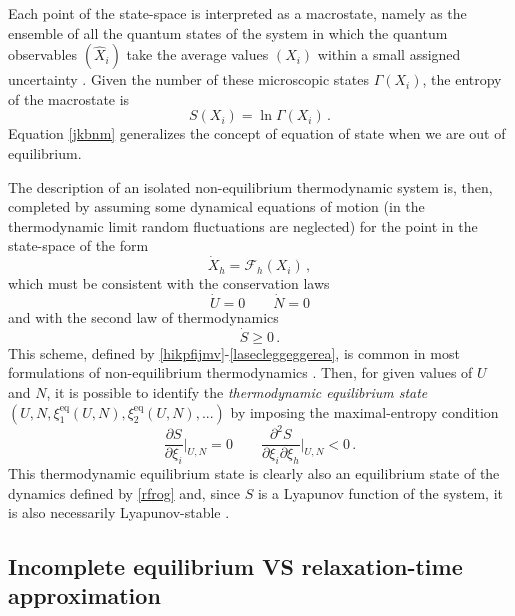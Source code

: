 \documentclass[a4paper, amsfonts, amssymb, amsmath, reprint, twocolumn, showkeys, nofootinbib]{revtex4-2}
\begin{document}
Each point of the state-space is interpreted as a macrostate, namely as the  ensemble of all the quantum states of the system in which the quantum observables $(\hat{X}_i)$ take the average values $(X_i)$ within a small assigned uncertainty \citep{peliti_book}. Given the number of these microscopic states $\Gamma(X_i)$, the entropy of the macrostate is  
\begin{equation}\label{jkbnm}
S(X_i) = \ln \Gamma(X_i) \, .
\end{equation}  
Equation \eqref{jkbnm} generalizes the concept of equation of state when we are out of equilibrium. 

The description of an isolated non-equilibrium thermodynamic system is, then, completed by assuming some dynamical equations of motion (in the thermodynamic limit random fluctuations are neglected) for the point in the state-space of the form
\begin{equation}\label{rfrog}
\dot{X}_h = \mathcal{F}_h (X_i) \, ,
\end{equation}
which must be consistent with the conservation laws
\begin{equation}\label{qwuiopv}
\dot{U}=0   \quad \quad   \dot{N}=0
\end{equation}
and with the second law of thermodynamics
\begin{equation}\label{lasecleggeggerea}
\dot{S} \geq 0 \, .
\end{equation}
This scheme, defined by \eqref{hikpfijmv}-\eqref{lasecleggeggerea}, is common in most formulations of non-equilibrium thermodynamics \citep{prigoginebook}. Then, for given values of $U$ and $N$, it is possible to identify the \textit{thermodynamic equilibrium state}
$(U,N,\xi_1^{\text{eq}}(U,N),\xi_2^{\text{eq}}(U,N),...)$
by imposing the maximal-entropy condition
\begin{equation}
\dfrac{\partial S}{\partial \xi_i} \bigg|_{U,N} =0   \quad \quad   \dfrac{\partial^2 S}{\partial \xi_i \partial \xi_h} \bigg|_{U,N} < 0 \, . 
\end{equation}
This thermodynamic equilibrium state is clearly also an equilibrium state of the dynamics defined by \eqref{rfrog} and, since $S$ is a Lyapunov function of the system, it is also necessarily Lyapunov-stable \citep{lasalle1961stability}. 

\subsection{Incomplete equilibrium VS relaxation-time approximation}\label{laparlata}
\end{document}
